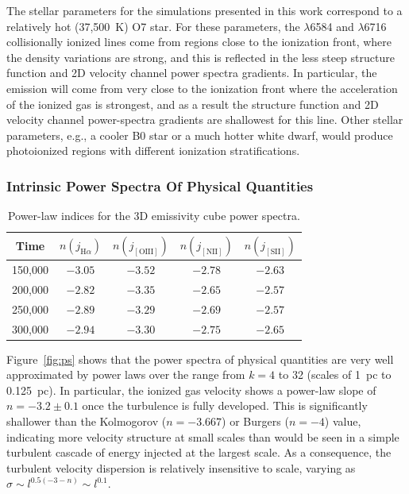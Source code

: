 \documentclass[useAMS,usenatbib]{mn2e}
\begin{document}
The stellar parameters for the simulations presented in this work
correspond to a relatively hot (37,500~K) O7 star. For these
parameters, the \nii$\lambda$6584 and \sii$\lambda$6716
collisionally ionized lines come from regions close to the ionization
front, where the density variations are strong, and this is reflected
in the less steep structure function and 2D velocity channel power
spectra gradients. In particular, the \sii{} emission will come from
very close to the ionization front where the acceleration of the
ionized gas is strongest, and as a result the structure function and
2D velocity channel power-spectra gradients are shallowest for this
line. Other stellar parameters, e.g., a cooler B0 star or a much
hotter white dwarf, would produce photoionized regions with 
different ionization stratifications.


\subsubsection{Intrinsic Power Spectra Of Physical Quantities}
\label{sssec:ips}
\begin{table}
\caption{Power-law indices for the 3D emissivity cube power spectra.}
\label{tab:psemiss}
\begin{tabular}{ccccc}
\hline
Time&$n(j_{{\mathrm{H}}\alpha})$ & $n(j_{\mathrm{[OIII]}})$ &
  $n(j_{\mathrm{[NII]}})$ & $n(j_{\mathrm{[SII]}})$ \\
\hline
150,000  &  $-3.05$    &    $-3.52$   &     $-2.78$  &    $-2.63$ \\
200,000  &  $-2.82$    &    $-3.35$   &     $-2.65$  &    $-2.57$ \\
250,000  &  $-2.89$    &    $-3.29$   &     $-2.69$  &    $-2.57$ \\
300,000  &  $-2.94$    &    $-3.30$   &     $-2.75$  &    $-2.65$ \\ 
\hline
\end{tabular}
\end{table}
Figure~\ref{fig:ps} shows that
the power spectra of physical quantities are very well approximated
by power laws over the range from $k = 4$ to 32
(scales of 1~pc to 0.125~pc).
In particular, the ionized gas velocity shows
a power-law slope of \(n = -3.2 \pm 0.1\)
once the turbulence is fully developed. 
This is significantly shallower than the Kolmogorov (\(n = -3.667\))
or Burgers (\(n = -4\)) value,
indicating more velocity structure at small scales than would be seen
in a simple turbulent cascade of energy injected at the largest scale.
As a consequence,
the turbulent velocity dispersion is relatively insensitive to scale,
varying as \(\sigma \sim l^{0.5 (-3 - n)} \sim l^{0.1}\). 
\end{document}
